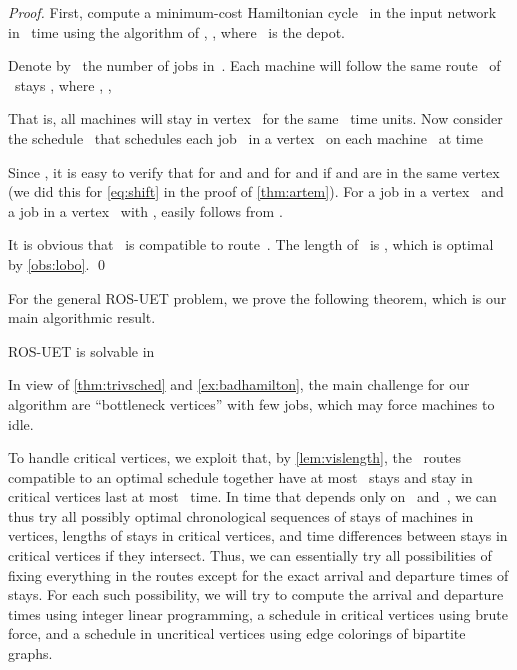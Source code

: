 \documentclass[natbib,sort,smallextended,envcountsame,envcountsect,numbook]{svjour3}
\newcommand{\ROSUPT}{\textsc{ROS-UET}}
\begin{document}
\begin{proof}
  First, compute a minimum-cost Hamiltonian cycle~
  in the input network~ in ~time
  using the algorithm of \citet{Bell62}, \citet{HelK62},
  where ~is the depot.

  Denote by ~the number of jobs in~.
  Each machine will follow the same route~
  of ~stays ,  where , ,
  
  That is, all machines will stay in vertex~ for the same ~time units.
  Now consider the schedule~ that
  schedules each job~ in a vertex~
  on each machine~ at time
  
  Since , it is easy to verify
  that 
  for  and 
  and for  and  if  and  are in the same vertex~
  (we did this for \eqref{eq:shift} in the proof of \cref{thm:artem}).
  For a job  in a vertex~
  and a job  in a vertex~
  with , 
  easily follows 
  from .

  It is obvious that ~is compatible to route~.
  The length of~ is , which is optimal by \cref{obs:lobo}.
  \qed
\end{proof}

\noindent
For the general \ROSUPT{} problem, we prove the following theorem,
which is our main algorithmic result.

\begin{theorem}\label{thm:ros-fpt}
  \ROSUPT{} is solvable in 
\end{theorem}

\noindent
In view of \cref{thm:trivsched} and \cref{ex:badhamilton},
the main challenge for our algorithm
are ``bottleneck vertices'' with few jobs,
which may force machines to idle.

\noindent
To handle critical vertices,
we exploit that,
by \cref{lem:vislength},
the ~routes compatible to an optimal schedule
together have at most ~stays
and stay in critical vertices last at most ~time.
In time that depends only on~ and~, 
we can thus try all possibly optimal chronological sequences
of stays of machines in vertices,
lengths of stays in critical vertices,
and time differences between stays in critical vertices
if they intersect.
Thus, we can essentially try all possibilities of fixing
everything in the routes
except for the exact arrival and departure times of stays.
For each such possibility,
we will try to compute the arrival and departure times
using integer linear programming,
a schedule in critical vertices using brute force,
and a schedule in uncritical vertices using edge colorings of bipartite graphs.
\end{document}
